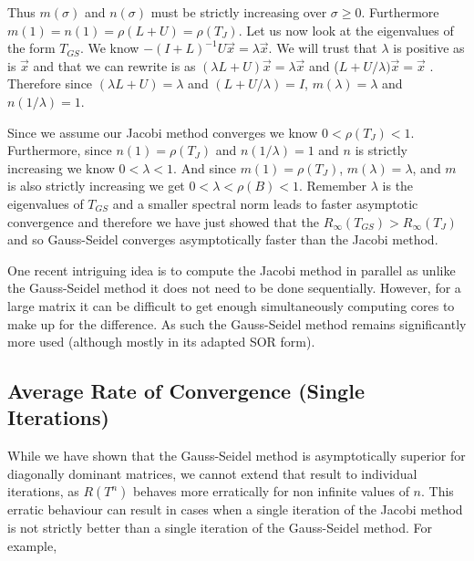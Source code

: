 \documentclass[12pt,letterpaper]{article}
\theoremstyle{definition}
\begin{document}
Thus $m(\sigma)$ and $n(\sigma)$ must be strictly increasing over $\sigma\geq0$. Furthermore $m(1)=n(1)=\rho(L+U)=\rho(T_J)$. Let us now look at the eigenvalues of the form $T_{GS}$. We know $-(I+L)^{-1}U\vec{x}=\lambda \vec{x}$. We will trust that $\lambda$ is positive as is $\vec{x}$ and that we can rewrite is as $(\lambda L+U)\vec{x}=\lambda \vec{x}$ and ($L+U/\lambda)\vec{x}=\vec{x}$ \cite{Varga62}. Therefore since $(\lambda L+U)=\lambda$ and $(L+U/\lambda)=I$, $m(\lambda)=\lambda$ and $n(1/\lambda)=1$.

Since we assume our Jacobi method converges we know $0<\rho(T_J)<1$. Furthermore, since $n(1)=\rho(T_J)$ and $n(1/\lambda)=1$ and $n$ is strictly increasing we know $0<\lambda<1$. And since $m(1)=\rho(T_J)$, $m(\lambda)=\lambda$, and $m$ is also strictly increasing we get $0<\lambda<\rho(B)<1$. Remember $\lambda$ is the eigenvalues of $T_{GS}$ and a smaller spectral norm leads to faster asymptotic convergence and therefore we have just showed that the $R_\infty(T_{GS})>R_\infty(T_J)$ and so Gauss-Seidel converges asymptotically faster than the Jacobi method.

One recent intriguing idea is to compute the Jacobi method in parallel as unlike the Gauss-Seidel method it does not need to be done sequentially. However, for a large matrix it can be difficult to get enough simultaneously computing cores to make up for the difference. As such the Gauss-Seidel method remains significantly more used (although mostly in its adapted SOR form).

\subsection{Average Rate of Convergence (Single Iterations)}
While we have shown that the Gauss-Seidel method is asymptotically superior for diagonally dominant matrices, we cannot extend that result to individual iterations, as $R(T^n)$ behaves more erratically for non infinite values of $n$. This erratic behaviour can result in cases when a single iteration of the Jacobi method is not strictly better than a single iteration of the Gauss-Seidel method. For example,
\end{document}
